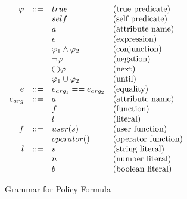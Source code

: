 \begin{table}[!ht]
    \centering
    $
    \begin{array}{rcll}
        \varphi    & ::=   & true                  & \text{(true predicate)} \\
                & |     & self                  & \text{(self predicate)} \\
                & |     & a                     & \text{(attribute name)} \\
                & |     & e                     & \text{(expression)} \\
                & |     & \varphi_1 \land \varphi_2   & \text{(conjunction)} \\
                & |     & \neg \varphi             & \text{(negation)} \\
                & |     & \bigcirc \varphi               & \text{(next)} \\
                & |     & \varphi_1 \cup \varphi_2      & \text{(until)} \\
        e       & ::=   & e_{arg_1} == e_{arg_2}    & \text{(equality)} \\
        e_{arg} & ::=   & a                     & \text{(attribute name)} \\
                & |     & f                     & \text{(function)} \\
                & |     & l                     & \text{(literal)} \\
        f       & ::=   & user(s)               & \text{(user function)} \\
                & |     & operator()            & \text{(operator function)} \\
        l       & ::=   & s                     & \text{(string literal)} \\
                & |     & n                     & \text{(number literal)} \\
                & |     & b                     & \text{(boolean literal)}
    \end{array}
    $
    \caption{Grammar for Policy Formula}
    \label{tab:pf-grammar}
\end{table}